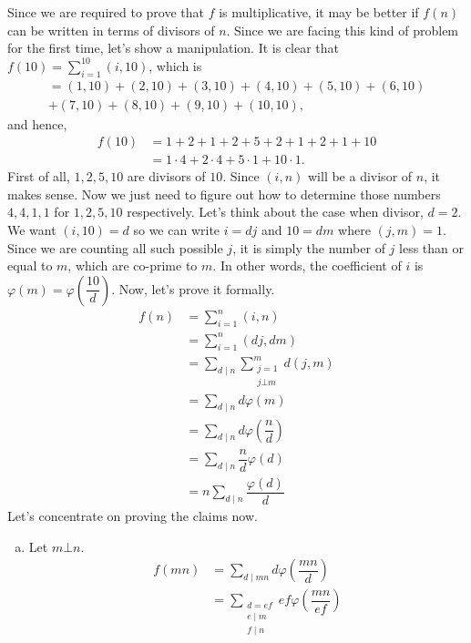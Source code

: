 \documentclass[problems.tex]{subfile}
\begin{document}
	\begin{solution}
		Since we are required to prove that $f$ is multiplicative, it may be better if $f(n)$ can be written in terms of divisors of $n$. Since we are facing this kind of problem for the first time, let's show a manipulation. It is clear that $f(10) = \sum_{i=1}^{10}(i,10)$, which is
			\begin{multline*}
					  = (1,10)+(2,10)+(3,10)+(4,10)+(5,10)+(6,10)\\+(7,10)+(8,10)+(9,10)+(10,10),
			\end{multline*}
		and hence,
			\begin{align*}
				f(10) & = 1+2+1+2+5+2+1+2+1+10\\
				& = 1\cdot4+2\cdot4+5\cdot1+10\cdot1.
			\end{align*}
		First of all, $1,2,5,10$ are divisors of $10$. Since $(i,n)$ will be a divisor of $n$, it makes sense. Now we just need to figure out how to determine those numbers $4,4,1,1$ for $1,2,5,10$ respectively. Let's think about the case when divisor, $d=2$. We want $(i,10)=d$ so we can write $i=dj$ and $10=dm$ where $(j,m)=1$. Since we are counting all such possible $j$, it is simply the number of $j$ less than or equal to $m$, which are co-prime to $m$. In other words, the coefficient of $i$ is $\varphi(m)=\varphi\left(\dfrac{10}{d}\right)$. Now, let's prove it formally.
			\begin{align*}
				f(n)
					& = \sum_{i=1}^{n}(i,n)\\
					& = \sum_{i=1}^{n}(dj,dm)\\
					& = \sum_{d\mid n}\sum_{\substack{j=1\\j\bot m}}^{m}d(j,m)\\
					& = \sum_{d\mid n}d\varphi(m)\\
					& = \sum_{d\mid n}d\varphi\left(\dfrac{n}{d}\right)\\
					& = \sum_{d\mid n}\dfrac{n}{d}\varphi(d)\\
					& = n\sum_{d\mid n}\dfrac{\varphi(d)}{d}
			\end{align*}
		Let's concentrate on proving the claims now.
			\begin{enumerate}[(a)]
				\item Let $m\bot n$.
						\begin{align*}
							f(mn) & = \sum_{d\mid mn}d\varphi\left(\dfrac{mn}{d}\right)\\
								  & = \sum_{\substack{d=ef\\e\mid m\\f\mid n}}ef\varphi\left(\dfrac{mn}{ef}\right)\\

\end{align*}
\end{enumerate}
\end{solution}
\end{document}
